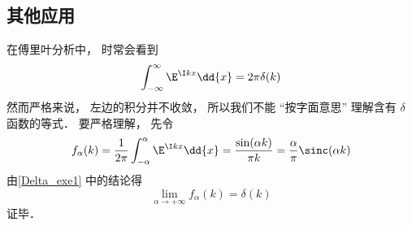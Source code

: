 \subsection{其他应用}
\begin{example}{}\label{Delta_ex1}
在傅里叶分析中， 时常会看到
\begin{equation}
\int_{-\infty}^\infty \E^{\I kx}\dd{x} = 2\pi \delta(k)
\end{equation}
然而严格来说， 左边的积分并不收敛， 所以我们不能 “按字面意思” 理解含有 $\delta$ 函数的等式． 要严格理解， 先令
\begin{equation}
f_\alpha(k) = \frac{1}{2\pi}\int_{-\alpha}^{\alpha} \E^{\I kx}\dd{x} = \frac{\sin(\alpha k)}{\pi k} = \frac{\alpha}{\pi} \sinc(\alpha k)
\end{equation}
由\autoref{Delta_exe1} 中的结论得
\begin{equation}
\lim_{\alpha\to+\infty} f_\alpha(k) = \delta(k)
\end{equation}
证毕．
\end{example}
